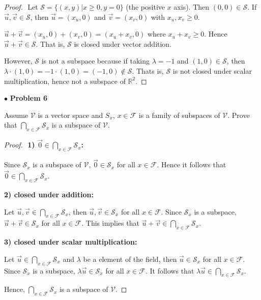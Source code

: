 \documentclass{article}
\begin{document}
\begin{proof}
$ $ \newline
Let $\mathcal{S} = \{ (x,y) | x \ge 0, y=0 \}$ (the positive $x$ axis). Then $(0,0) \in \mathcal{S}$. If $\vec{u}, \vec{v} \in \mathcal{S}$, then $\vec{u} = (x_{u},0)$ and $\vec{v} = (x_{v},0)$ with $x_{u}, x_{v} \ge 0$. 

$\vec{u} + \vec{v} = (x_{u}, 0) + (x_{v}, 0) = (x_{u} + x_{v} ,0)$ where $x_{u} + x_{v} \ge 0$. Hence $\vec{u} + \vec{v} \in \mathcal{S}$. That is, $\mathcal{S}$ is closed under vector addition.

However, $\mathcal{S}$ is not a subspace because if taking $\lambda = -1$ and $(1, 0) \in \mathcal{S}$, then $\lambda \cdot (1,0) = -1 \cdot (1,0) = (-1,0) \notin \mathcal{S}$. Thats is, $\mathcal{S}$ is not closed under scalar multiplication, hence not a subspace of $\mathbb{R}^2$.
\end{proof}


\newpage
$\bullet$ \textbf{Problem 6}
\medskip

\begin{itshape}
Assume $\mathcal{V}$ is a vector space and $S_{x}$, $x \in \mathcal{F}$ is a family of subspaces of $\mathcal{V}$. Prove that $\bigcap \limits_{x \in \mathcal{F}} \mathcal{S}_{x}$ is a subspace of $\mathcal{V}$.
\end{itshape}
\medskip

\begin{proof}
$ $ \newline
\textbf{1) $\vec{0} \in \bigcap \limits_{x \in \mathcal{F}} \mathcal{S}_{x}$:}

Since $\mathcal{S}_{x}$ is a subspace of $\mathcal{V}$, $\vec{0} \in \mathcal{S}_{x}$ for all $x \in \mathcal{F}$. Hence it follows that $\vec{0} \in \bigcap \limits_{x \in \mathcal{F}} \mathcal{S}_{x}$.
\smallskip

\textbf{2) closed under addition:}

Let $\vec{u}, \vec{v} \in \bigcap \limits_{x \in \mathcal{F}} \mathcal{S}_{x}$, then $\vec{u}, \vec{v} \in \mathcal{S}_{x}$ for all $x \in \mathcal{F}$. Since $\mathcal{S}_{x}$ is a subspace, $\vec{u} + \vec{v} \in \mathcal{S}_{x}$ for all $x \in \mathcal{F}$. This implies that $\vec{u} + \vec{v} \in \bigcap \limits_{x \in \mathcal{F}} \mathcal{S}_{x}$.
\smallskip

\textbf{3) closed under scalar multiplication:}

Let $\vec{u} \in \bigcap \limits_{x \in \mathcal{F}} \mathcal{S}_{x}$ and $\lambda$ be a element of the field, then $\vec{u} \in \mathcal{S}_{x}$ for all $x \in \mathcal{F}$. Since $\mathcal{S}_{x}$ is a subspace, $\lambda \vec{u} \in \mathcal{S}_{x}$ for all $x \in \mathcal{F}$. It follows that $\lambda \vec{u} \in \bigcap \limits_{x \in \mathcal{F}} \mathcal{S}_{x}$.

Hence, $\bigcap \limits_{x \in \mathcal{F}} \mathcal{S}_{x}$ is a subspace of $\mathcal{V}$.
\end{proof}
\end{document}
